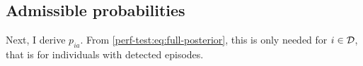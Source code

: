 \documentclass[thesis.tex]{subfiles}
\begin{document}

\subsection{Admissible probabilities}

Next, I derive $p_{ia}$.
From \cref{perf-test:eq:full-posterior}, this is only needed for $i \in \mathcal{D}$, that is for individuals with detected episodes.
\end{document}
